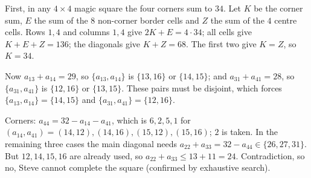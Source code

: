 First, in any $4\times4$ magic square the four corners sum to $34$. Let $K$ be the corner sum, $E$ the sum of the $8$ non-corner border cells and $Z$ the sum of the $4$ centre cells. Rows $1,4$ and columns $1,4$ give $2K+E=4\cdot34$; all cells give $K+E+Z=136$; the diagonals give $K+Z=68$. The first two give $K=Z$, so $K=34$.

Now $a_{13}+a_{14}=29$, so $\{a_{13},a_{14}\}$ is $\{13,16\}$ or $\{14,15\}$; and $a_{31}+a_{41}=28$, so $\{a_{31},a_{41}\}$ is $\{12,16\}$ or $\{13,15\}$. These pairs must be disjoint, which forces $\{a_{13},a_{14}\}=\{14,15\}$ and $\{a_{31},a_{41}\}=\{12,16\}$.

Corners: $a_{44}=32-a_{14}-a_{41}$, which is $6,2,5,1$ for $(a_{14},a_{41})=(14,12),(14,16),(15,12),(15,16)$; $2$ is taken. In the remaining three cases the main diagonal needs $a_{22}+a_{33}=32-a_{44}\in\{26,27,31\}$. But $12,14,15,16$ are already used, so $a_{22}+a_{33}\le13+11=24$. Contradiction, so $\boxed{\text{no}}$, Steve cannot complete the square (confirmed by exhaustive search).
